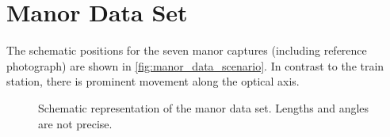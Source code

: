 \section{Manor Data Set}

The schematic positions for the seven manor captures (including reference
photograph) are shown in \autoref{fig:manor_data_scenario}. In contrast to the
train station, there is prominent movement along the optical axis.

\begin{figure}
   {\centering      
      
   \caption{Schematic representation of the manor data set. Lengths and angles are not
   precise.}
   \label{fig:manor_data_scenario}}
\end{figure}


